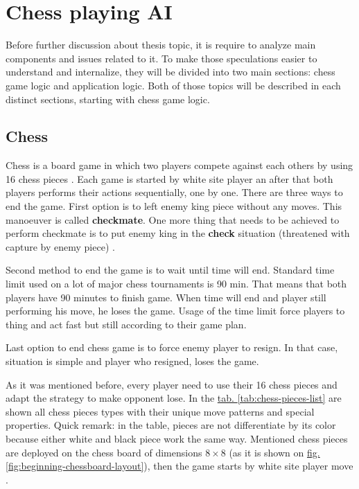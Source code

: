 
\chapter{Chess playing AI}\label{sec:topic-analysis}
Before further discussion about thesis topic, it is require to analyze main components and issues related to it. To make those speculations easier to understand and internalize, they will be divided into two main sections: chess game logic and application logic. Both of those topics will be described in each distinct sections, starting with chess game logic.
    \section{Chess}
    Chess is a board game in which two players compete against each others by using 16 chess pieces \cite{bib:book-chess-bible}. Each game is started by white site player an after that both players performs their actions sequentially, one by one. There are three ways to end the game. First option is to left enemy king piece without any moves. This manoeuver is called \textbf{checkmate}. One more thing that needs to be achieved to perform checkmate is to put enemy king in the \textbf{check} situation (threatened with capture by enemy piece) \cite{bib:book-chess-bible,bib:internet-learn-how-to-play-chess}. 

    Second method to end the game is to wait until time will end. Standard time limit used on a lot of major chess tournaments is 90 min. That means that both players have 90 minutes to finish game. When time will end and player still performing his move, he loses the game. Usage of the time limit force players to thing and act fast but still according to their game plan.

    Last option to end chess game is to force enemy player to resign. In that case, situation is simple and player who resigned, loses the game. 
    
    As it was mentioned before, every player need to use their 16 chess pieces and adapt the strategy to make opponent lose. In the \hyperref[tab:chess-pieces-list]{tab. \ref*{tab:chess-pieces-list}} are shown all chess pieces types with their unique move patterns and special properties. Quick remark: in the table, pieces are not differentiate by its color because either white and black piece work the same way. Mentioned chess pieces are deployed on the chess board of dimensions $8 \times 8$ (as it is shown on \hyperref[fig:beginning-chessboard-layout]{fig. \ref*{fig:beginning-chessboard-layout}}), then the game starts by white site player move \cite{bib:book-chess-bible,bib:book-bobby-fisher-teaches-chess,bib:book-mastering-chess-logic}.

